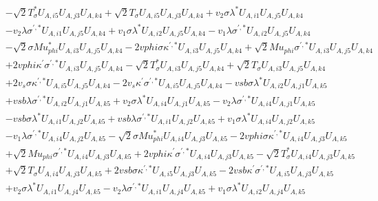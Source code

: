 \begin{align}
 &- \sqrt{2} T_{\sigma}^* U_{A,{i 5}} U_{A,{j 3}} U_{A,{k 4}} +\sqrt{2} T_{\sigma} U_{A,{i 5}} U_{A,{j 3}} U_{A,{k 4}} +v_2 \sigma \lambda^* U_{A,{i 1}} U_{A,{j 5}} U_{A,{k 4}} \nonumber \\ 
 &- v_2 \lambda \sigma^{\prime,*} U_{A,{i 1}} U_{A,{j 5}} U_{A,{k 4}} +v_1 \sigma \lambda^* U_{A,{i 2}} U_{A,{j 5}} U_{A,{k 4}} - v_1 \lambda \sigma^{\prime,*} U_{A,{i 2}} U_{A,{j 5}} U_{A,{k 4}} \nonumber \\ 
 &- \sqrt{2} \sigma Mu_{phi}^* U_{A,{i 3}} U_{A,{j 5}} U_{A,{k 4}} -2 vphi \sigma \kappa^{\prime,*} U_{A,{i 3}} U_{A,{j 5}} U_{A,{k 4}} +\sqrt{2} Mu_{phi} \sigma^{\prime,*} U_{A,{i 3}} U_{A,{j 5}} U_{A,{k 4}} \nonumber \\ 
 &+2 vphi \kappa^\prime \sigma^{\prime,*} U_{A,{i 3}} U_{A,{j 5}} U_{A,{k 4}} - \sqrt{2} T_{\sigma}^* U_{A,{i 3}} U_{A,{j 5}} U_{A,{k 4}} +\sqrt{2} T_{\sigma} U_{A,{i 3}} U_{A,{j 5}} U_{A,{k 4}} \nonumber \\ 
 &+2 v_s \sigma \kappa^{\prime,*} U_{A,{i 5}} U_{A,{j 5}} U_{A,{k 4}} -2 v_s \kappa^\prime \sigma^{\prime,*} U_{A,{i 5}} U_{A,{j 5}} U_{A,{k 4}} - vsb \sigma \lambda^* U_{A,{i 2}} U_{A,{j 1}} U_{A,{k 5}} \nonumber \\ 
 &+vsb \lambda \sigma^{\prime,*} U_{A,{i 2}} U_{A,{j 1}} U_{A,{k 5}} +v_2 \sigma \lambda^* U_{A,{i 4}} U_{A,{j 1}} U_{A,{k 5}} - v_2 \lambda \sigma^{\prime,*} U_{A,{i 4}} U_{A,{j 1}} U_{A,{k 5}} \nonumber \\ 
 &- vsb \sigma \lambda^* U_{A,{i 1}} U_{A,{j 2}} U_{A,{k 5}} +vsb \lambda \sigma^{\prime,*} U_{A,{i 1}} U_{A,{j 2}} U_{A,{k 5}} +v_1 \sigma \lambda^* U_{A,{i 4}} U_{A,{j 2}} U_{A,{k 5}} \nonumber \\ 
 &- v_1 \lambda \sigma^{\prime,*} U_{A,{i 4}} U_{A,{j 2}} U_{A,{k 5}} - \sqrt{2} \sigma Mu_{phi}^* U_{A,{i 4}} U_{A,{j 3}} U_{A,{k 5}} -2 vphi \sigma \kappa^{\prime,*} U_{A,{i 4}} U_{A,{j 3}} U_{A,{k 5}} \nonumber \\ 
 &+\sqrt{2} Mu_{phi} \sigma^{\prime,*} U_{A,{i 4}} U_{A,{j 3}} U_{A,{k 5}} +2 vphi \kappa^\prime \sigma^{\prime,*} U_{A,{i 4}} U_{A,{j 3}} U_{A,{k 5}} - \sqrt{2} T_{\sigma}^* U_{A,{i 4}} U_{A,{j 3}} U_{A,{k 5}} \nonumber \\ 
 &+\sqrt{2} T_{\sigma} U_{A,{i 4}} U_{A,{j 3}} U_{A,{k 5}} +2 vsb \sigma \kappa^{\prime,*} U_{A,{i 5}} U_{A,{j 3}} U_{A,{k 5}} -2 vsb \kappa^\prime \sigma^{\prime,*} U_{A,{i 5}} U_{A,{j 3}} U_{A,{k 5}} \nonumber \\ 
 &+v_2 \sigma \lambda^* U_{A,{i 1}} U_{A,{j 4}} U_{A,{k 5}} - v_2 \lambda \sigma^{\prime,*} U_{A,{i 1}} U_{A,{j 4}} U_{A,{k 5}} +v_1 \sigma \lambda^* U_{A,{i 2}} U_{A,{j 4}} U_{A,{k 5}} \nonumber \\ 

\end{align}

